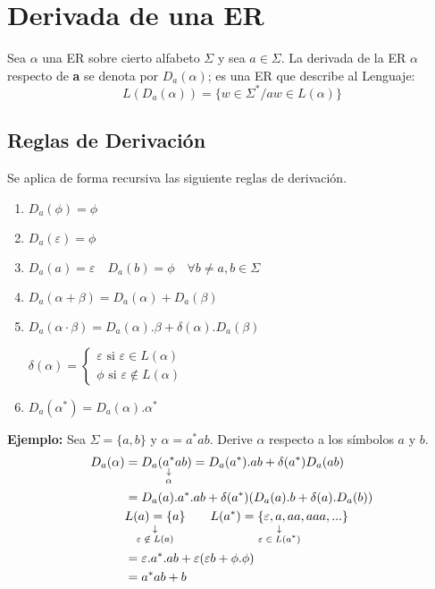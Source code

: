 \chapter{Derivada de una ER}

Sea $\alpha$ una ER sobre cierto alfabeto $\Sigma$ y sea $a\in \Sigma$. La derivada de la ER $\alpha$ respecto de \textbf{a} se denota por $D_a(\alpha)$; es una ER que describe al Lenguaje:
$$L(D_a(\alpha))=\{ w\in\Sigma^* / aw \in L(\alpha)\}$$

\section{Reglas de Derivación}

Se aplica de forma recursiva las siguiente reglas de derivación.
\begin{enumerate}
 \item $D_a(\phi)=\phi$
 \item $D_a(\varepsilon)=\phi$
 \item $D_a(a)=\varepsilon \quad D_a(b)=\phi \quad \forall b\not=a, b\in \Sigma$
 \item $D_a(\alpha+\beta)= D_a(\alpha)+D_a(\beta)$
 \item $D_a(\alpha \cdot \beta)=D_a(\alpha). \beta + \delta(\alpha). D_a(\beta)$ %
 
$\delta(\alpha)=\left \{ \begin{array}{c}
			 \varepsilon \mbox{ si }\varepsilon \in L(\alpha) \\
			 \phi \mbox{ si } \varepsilon \not\in L(\alpha)\end{array}\right.$
			 
 \item $D_a(\alpha^*)=D_a(\alpha). \alpha^*$
\end{enumerate}

\textbf{Ejemplo: }Sea $\Sigma=\{ a,b\}$ y $\alpha=a^* ab$. Derive $\alpha$ respecto a los símbolos $a$ y $b$.
\begin{align*}
D_a(\alpha)	&=D_a(\downlegend{a^*}{$\alpha$} ab) = D_a(a^*). ab+ \delta(a^*)D_a(ab)\\
			&=D_a(a).a^* .ab + \delta(a^*)(D_a(a).b+\delta(a).D_a(b))\\
			&\downlegend{L(a)=\{a\}}{$\varepsilon \not\in L(a)$} \qquad \downlegend{L(a^*)=\{\varepsilon,a,aa,aaa,...\}}{$\varepsilon\in L(a^*)$}\\
			&=\varepsilon.a^*.ab+\varepsilon(\varepsilon b + \phi.\phi)\\
			&=a^* ab+b
\end{align*}

